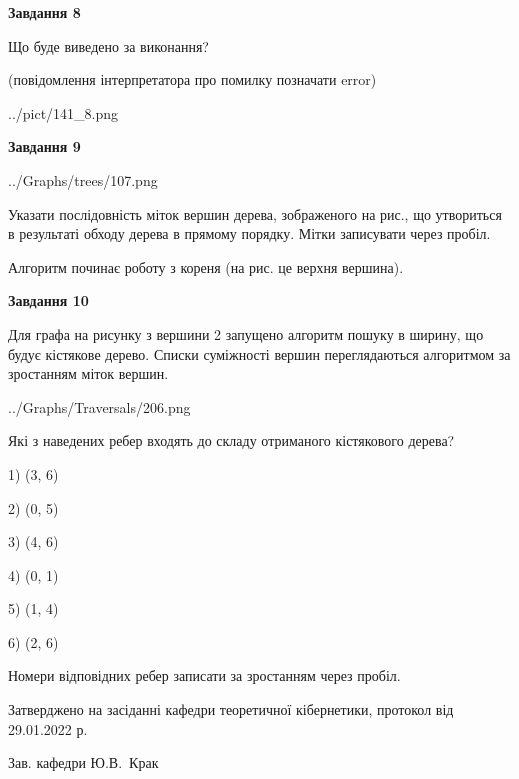 \documentclass[12pt, ukrainian]{article}
\begin{document}
{\begin {large}
{\begin {center}\textbf{Завдання 8}\end {center}}\par
Що буде виведено за виконання?\par
 (повідомлення інтерпретатора про помилку позначати error)\par
\begin{center}
	{../pict/141_8.png}
\end{center}
\newpage

{\begin {center}\textbf{Завдання 9}\end {center}}\par

\begin{center}
	{../Graphs/trees/107.png}
\end{center}
Указати послідовність міток вершин дерева, зображеного на рис., що утвориться в результаті обходу дерева в прямому порядку. Мітки записувати через пробіл.\par Алгоритм починає роботу з кореня (на рис. це верхня вершина).\par
\newpage

{\begin {center}\textbf{Завдання 10}\end {center}}\par
Для графа на рисунку з вершини 2 запущено алгоритм пошуку в ширину, що будує кістякове дерево. Списки суміжності вершин переглядаються алгоритмом за зростанням міток вершин.\par
\begin{center}
	{../Graphs/Traversals/206.png}
\end{center}
\par Які з наведених ребер входять до складу отриманого кістякового дерева?\par
1) (3, 6)\par
2) (0, 5)\par
3) (4, 6)\par
4) (0, 1)\par
5) (1, 4)\par
6) (2, 6)\par
{\vskip 15pt} Номери відповідних ребер записати за зростанням через пробіл.\par
\newpage


\end {large}
}
{\smallskip \begin {small} Затверджено на засіданні кафедри теоретичної кібернетики, протокол  від   29.01.2022 р.\par\smallskip\smallskip
{\parbox {6.5 cm}{Зав. кафедри \dotfill Ю.В.~Крак}} \end{small}}
\end{document}

